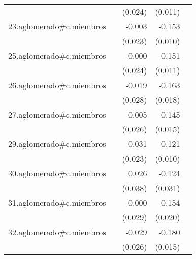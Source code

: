 {\begin{longtable}{l*{4}{D{.}{.}{-1}}}
            &                     &     (0.024)         &     (0.011)         &                     \\
\addlinespace
23.aglomerado#c.miembros&                     &      -0.003         &      -0.153\sym{***}&                     \\
            &                     &     (0.023)         &     (0.010)         &                     \\
\addlinespace
25.aglomerado#c.miembros&                     &      -0.000         &      -0.151\sym{***}&                     \\
            &                     &     (0.024)         &     (0.011)         &                     \\
\addlinespace
26.aglomerado#c.miembros&                     &      -0.019         &      -0.163\sym{***}&                     \\
            &                     &     (0.028)         &     (0.018)         &                     \\
\addlinespace
27.aglomerado#c.miembros&                     &       0.005         &      -0.145\sym{***}&                     \\
            &                     &     (0.026)         &     (0.015)         &                     \\
\addlinespace
29.aglomerado#c.miembros&                     &       0.031         &      -0.121\sym{***}&                     \\
            &                     &     (0.023)         &     (0.010)         &                     \\
\addlinespace
30.aglomerado#c.miembros&                     &       0.026         &      -0.124\sym{***}&                     \\
            &                     &     (0.038)         &     (0.031)         &                     \\
\addlinespace
31.aglomerado#c.miembros&                     &      -0.000         &      -0.154\sym{***}&                     \\
            &                     &     (0.029)         &     (0.020)         &                     \\
\addlinespace
32.aglomerado#c.miembros&                     &      -0.029         &      -0.180\sym{***}&                     \\
            &                     &     (0.026)         &     (0.015)         &                     \\

\end{longtable}}
